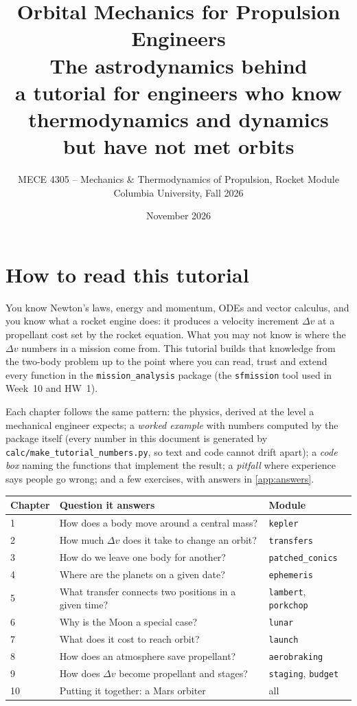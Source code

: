\documentclass[11pt,letterpaper,oneside]{report}
\title{\color{CUblue}\textbf{Orbital Mechanics for Propulsion Engineers}\\[6pt]
\Large The astrodynamics behind \code{mission\_analysis}\\[4pt]
\large a tutorial for engineers who know thermodynamics and dynamics\\ but have not met orbits}
\author{MECE 4305 -- Mechanics \& Thermodynamics of Propulsion, Rocket Module\\Columbia University, Fall 2026}
\date{November 2026}
\newcommand{\dv}{\Delta v}
\newcommand{\code}[1]{\texttt{#1}}
\begin{document}
\maketitle

\chapter*{How to read this tutorial}

You know Newton's laws, energy and momentum, ODEs and vector calculus, and you know what a
rocket engine does: it produces a velocity increment $\dv$ at a propellant cost set by the rocket
equation. What you may not know is where the $\dv$ numbers in a mission come from. This tutorial
builds that knowledge from the two-body problem up to the point where you can read, trust and
extend every function in the \code{mission\_analysis} package (the \code{sfmission} tool used in
Week~10 and HW~1).

Each chapter follows the same pattern: the physics, derived at the level a mechanical engineer
expects; a \emph{worked example} with numbers computed by the package itself (every number in
this document is generated by \code{calc/make\_tutorial\_numbers.py}, so text and code cannot
drift apart); a \emph{code box} naming the functions that implement the result; a \emph{pitfall}
where experience says people go wrong; and a few exercises, with answers in \cref{app:answers}.

\begin{center}\small
\begin{tabular}{lll}\toprule
Chapter & Question it answers & Module \\\midrule
1 & How does a body move around a central mass? & \code{kepler} \\
2 & How much $\dv$ does it take to change an orbit? & \code{transfers} \\
3 & How do we leave one body for another? & \code{patched\_conics} \\
4 & Where are the planets on a given date? & \code{ephemeris} \\
5 & What transfer connects two positions in a given time? & \code{lambert}, \code{porkchop} \\
6 & Why is the Moon a special case? & \code{lunar} \\
7 & What does it cost to reach orbit? & \code{launch} \\
8 & How does an atmosphere save propellant? & \code{aerobraking} \\
9 & How does $\dv$ become propellant and stages? & \code{staging}, \code{budget} \\
10 & Putting it together: a Mars orbiter & all \\\bottomrule
\end{tabular}
\end{center}
\end{document}
